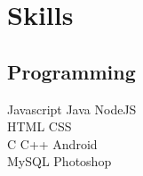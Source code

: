 \documentclass[]{deedy-resume-openfont}
\begin{document}
\begin{minipage}[t]{0.33\textwidth}

\section{Skills}
\subsection{Programming}
Javascript \textbullet{} Java \textbullet{} NodeJS\\ 
 \textbullet{} HTML \textbullet{} CSS\\ 
C \textbullet{} C++ \textbullet{} Android\\
MySQL\textbullet{} Photoshop\\
\sectionsep

%
%

\end{minipage} 
\hfill
\end{document}
